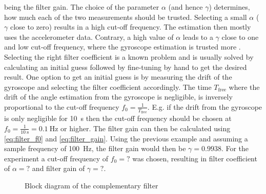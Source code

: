 being the filter gain.
The choice of the parameter $\alpha$ (and hence $\gamma$) determines, how much each of the two measurements should be trusted.
Selecting a small $\alpha$ ($\gamma$ close to zero) results in a high cut-off frequency.
The estimation then mostly uses the accelerometer data.
Contrary, a high value of $\alpha$ leads to a $\gamma$ close to one and low cut-off frequency, where the gyroscope estimation is trusted more \cite{1997Baerveldt}.\\
Selecting the right filter coefficient is a known problem and is usually solved by calculating an initial guess followed by fine-tuning by hand to get the desired result.
One option to get an initial guess is by measuring the drift of the gyroscope and selecting the filter coefficient accordingly.
The time $T_\mathrm{free}$ where the drift of the angle estimation from the gyroscope is negligible, is inversely proportional to the cut-off frequency $f_0 = \frac{1}{T_\mathrm{free}}$.
E.g. if the drift from the gyroscope is only negligible for \SI{10}{\second} then the cut-off frequency should be chosen at $f_0 = \frac{1}{\SI{10}{\second}} = \SI{0.1}{\hertz}$ or higher.
The filter gain can then be calculated using \cref{eq:filter_f0} and \cref{eq:filter_gain}.
Using the previous example and assuming a sample frequency of \SI{100}{\hertz}, the filter gain would then be $\gamma = 0.9938$.
For the experiment a cut-off frequency of $f_0=?$ was chosen, resulting in filter coefficient of $\alpha = ?$ and filter gain of $\gamma = ?$.
\begin{figure}[htb]
	\centering
	
	\caption{Block diagram of the complementary filter}
	\label{fig:tikz_complementary_filter}
\end{figure}


